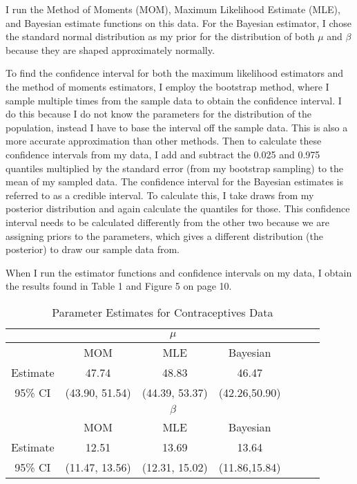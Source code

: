 \documentclass{svproc}
\begin{document}
I run the Method of Moments (MOM), Maximum Likelihood Estimate (MLE), and Bayesian estimate functions on this data. For the Bayesian estimator, I chose the standard normal distribution as my prior for the distribution of both $\mu$ and $\beta$ because they are shaped approximately normally.

To find the confidence interval for both the maximum likelihood estimators and the method of moments estimators, I employ the bootstrap method, where I sample multiple times from the sample data to obtain the confidence interval. I do this because I do not know the parameters for the distribution of the population, instead I have to base the interval off the sample data. This is also a more accurate approximation than other methods. Then to calculate these confidence intervals from my data, I add and subtract the 0.025 and 0.975 quantiles multiplied by the standard error (from my bootstrap sampling) to the mean of my sampled data. The confidence interval for the Bayesian estimates is referred to as a credible interval. To calculate this, I take draws from my posterior distribution and again calculate the quantiles for those. This confidence interval needs to be calculated differently from the other two because we are assigning priors to the parameters, which gives a different distribution (the posterior) to draw our sample data from.

When I run the estimator functions and confidence intervals on my data, I obtain the results found in Table 1 and Figure 5 on page 10. 

\begin{table}[H]
\begin{center}
\begin{tabular}{|c|c|c|c|c|c|c|}
\hline
  &\multicolumn{3}{|c|}{$\mu$}\\
\hline
 & MOM & MLE & Bayesian \\
\hline
Estimate & 47.74 & 48.83 & 46.47\\
\hline
95\% CI & (43.90, 51.54) & (44.39, 53.37) & (42.26,50.90)\\
\hline
\hline
& \multicolumn{3}{|c|}{$\beta$} \\
\hline
 & MOM & MLE & Bayesian \\
\hline
Estimate & 12.51 & 13.69 & 13.64 \\
\hline
95\% CI & (11.47, 13.56) & (12.31, 15.02) & (11.86,15.84)\\
\hline
\end{tabular}
\medskip
\caption{Parameter Estimates for Contraceptives Data}
\label{tab1}
\end{center}
\end{table}
\end{document}
